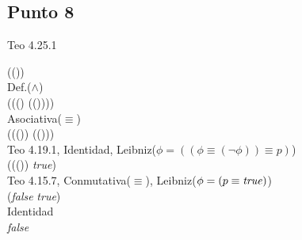 \documentclass{article}
\begin{document}
\subsection{Punto 8}
\begin{logicenv}{Teo 4.25.1}
    \begin{derivation}
            (\phi \land (\neg \phi))\\
        Def.($\land$)\\
            (\phi \equiv ((\neg \phi) \equiv (\phi \lor (\neg \phi))))\\
        Asociativa($\equiv$)\\
            ((\phi \equiv (\neg \phi)) \equiv (\phi \lor (\neg \phi)))\\
        Teo 4.19.1, Identidad, Leibniz($\phi = ((\phi \equiv (\neg \phi)) \equiv p)$)\\
            ((\phi \equiv (\neg \phi)) \equiv \textrm{\textit{true}})\\
        Teo 4.15.7, Conmutativa($\equiv$), Leibniz($\phi = (p \equiv \textrm{\textit{true}})$)\\
            (\textrm{\textit{false}} \equiv \textrm{\textit{true}})\\
        Identidad\\
            \textrm{\textit{false}}
    \end{derivation}
\end{logicenv}
\end{document}
